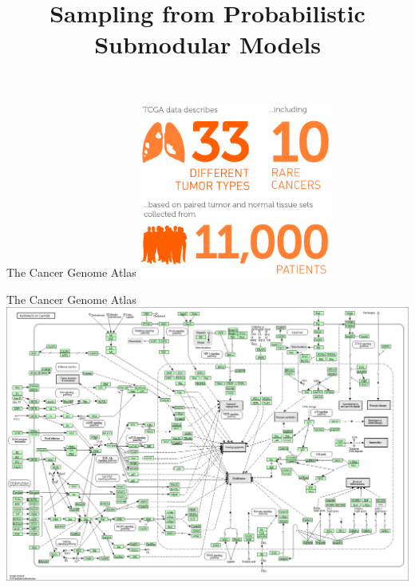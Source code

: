 \documentclass[mathserif]{beamer}
\title[Sampling from Probabilistic Submodular Models]
{Sampling from Probabilistic Submodular Models}
\author[Alkis Gotovos]{}
\begin{document}



\begin{frame}{The Cancer Genome Atlas}
\vspace{0.5em}
\centering
\includegraphics[width=2.5in]{figures/tcga.png}\\[-0.3em]
\hspace{12em}
\end{frame}

\begin{frame}{The Cancer Genome Atlas}
\vspace{0.5em}
\centering
\includegraphics[width=\textwidth]{figures/pathways_alt.png}\\[-0.3em]
\hfill{}
\end{frame}
\end{document}

